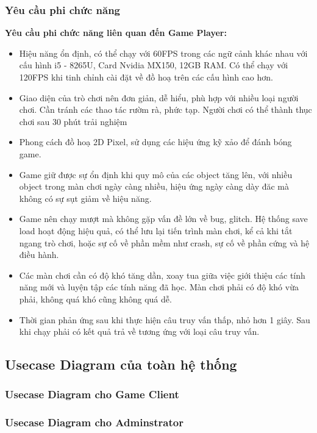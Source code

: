 \subsubsection{Yêu cầu phi chức năng}

\textbf{Yêu cầu phi chức năng liên quan đến Game Player:}
\begin{itemize}
	\item Hiệu năng ổn định, có thể chạy với 60FPS trong các ngữ cảnh khác nhau với cấu hình i5 - 8265U, Card Nvidia MX150, 12GB RAM. Có thể chạy với 120FPS khi tinh chỉnh cài đặt về đồ hoạ trên các cấu hình cao hơn.
	\item Giao diện của trò chơi nên đơn giản, dễ hiểu, phù hợp với nhiều loại người chơi. Cần tránh các thao tác rườm rà, phức tạp.
	Người chơi có thể thành thục chơi sau 30 phút trải nghiệm
	\item Phong cách đồ hoạ 2D Pixel, sử dụng các hiệu ứng kỹ xảo để đánh bóng game.
	\item Game giữ được sự ổn định khi quy mô của các object tăng lên, với nhiều object trong màn chơi ngày càng nhiều, hiệu ứng ngày càng dày đăc mà không có sự sụt giảm về hiệu năng.
	\item Game nên chạy mượt mà không gặp vấn đề lớn về bug, glitch. Hệ thống save load hoạt động hiệu quả, có thể lưu lại tiến trình màn chơi, kể cả khi tắt ngang trò chơi, hoặc sự cố về phần mềm như crash, sự cố về phần cứng và hệ điều hành.
	\item Các màn chơi cần có độ khó tăng dần, xoay tua giữa việc giới thiệu các tính năng mới và luyện tập các tính năng đã học. Màn chơi phải có độ khó vừa phải, không quá khó cũng không quá dễ.
	\item Thời gian phản ứng sau khi thực hiện câu truy vấn thấp, nhỏ hơn 1 giây. Sau khi chạy phải có kết quả trả về tương ứng với loại câu truy vấn.
\end{itemize}
\subsection{Usecase Diagram của toàn hệ thống}
\subsubsection{Usecase Diagram cho Game Client}
\subsubsection{Usecase Diagram cho Adminstrator}